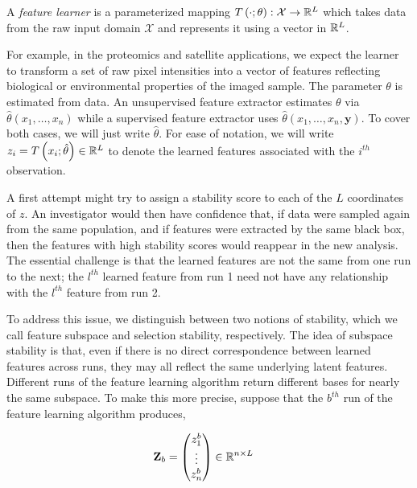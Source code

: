 \begin{definition}
A \textit{feature learner} is a parameterized mapping $T\left(\cdot;
\theta\right): \mathcal{X} \to \mathbb{R}^{L}$ which takes data from the raw input
domain $\mathcal{X}$ and represents it using a vector in $\mathbb{R}^{L}$.
\end{definition}

For example, in the proteomics and satellite applications, we expect the learner
to transform a set of raw pixel intensities into a vector of features reflecting
biological or environmental properties of the imaged sample. The parameter
$\theta$ is estimated from data. An unsupervised feature extractor estimates
$\theta$ via $\hat{\theta}\left(x_{1}, \dots, x_{n}\right)$ while a supervised
feature extractor uses $\hat{\theta}\left(x_{1}, \dots, x_{n},
\mathbf{y}\right)$. To cover both cases, we will just write $\hat{\theta}$. For
ease of notation, we will write $z_{i} = T\left(x_{i}; \hat{\theta}\right) \in
\mathbb{R}^{L}$ to denote the learned features associated with the $i^{th}$
observation.

A first attempt might try to assign a stability score to each of the $L$
coordinates of $z$. An investigator would then have confidence that, if data
were sampled again from the same population, and if features were extracted by
the same black box, then the features with high stability scores would reappear
in the new analysis. The essential challenge is that the learned features are
not the same from one run to the next; the $l^{th}$ learned feature from run 1
need not have any relationship with the $l^{th}$ feature from run 2.

To address this issue, we distinguish between two notions of stability, which we
call feature subspace and selection stability, respectively. The idea of
subspace stability is that, even if there is no direct correspondence between
learned features across runs, they may all reflect the same underlying latent
features. Different runs of the feature learning algorithm return different
bases for nearly the same subspace. To make this more precise, suppose that the
$b^{th}$ run of the feature learning algorithm produces,

\begin{align}
\mathbf{Z}_{b} &= \begin{pmatrix}
z^{b}_{1} \\
\vdots \\
z^{b}_{n}
\end{pmatrix} \in \mathbb{R}^{n \times L}
\end{align}

